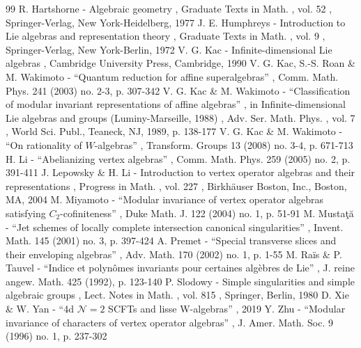 \documentclass[11pt]{article}
\numberwithin{equation}{section}
\begin{document}
\begin{thebibliography}{99}
 R. Hartshorne - Algebraic geometry , Graduate Texts in Math. , vol. 52 , Springer-Verlag, New York-Heidelberg, 1977
 J. E. Humphreys - Introduction to Lie algebras and representation theory , Graduate Texts in Math. , vol. 9 , Springer-Verlag, New York-Berlin, 1972
 V. G. Kac - Infinite-dimensional Lie algebras , Cambridge University Press, Cambridge, 1990
 V. G. Kac, S.-S. Roan \& M. Wakimoto - “Quantum reduction for affine superalgebras” , Comm. Math. Phys. 241 (2003) no. 2-3, p. 307-342
 V. G. Kac \& M. Wakimoto - “Classification of modular invariant representations of affine algebras” , in Infinite-dimensional Lie algebras and groups (Luminy-Marseille, 1988) , Adv. Ser. Math. Phys. , vol. 7 , World Sci. Publ., Teaneck, NJ, 1989, p. 138-177
 V. G. Kac \& M. Wakimoto - “On rationality of $W$-algebras” , Transform. Groups 13 (2008) no. 3-4, p. 671-713
 H. Li - “Abelianizing vertex algebras” , Comm. Math. Phys. 259 (2005) no. 2, p. 391-411
 J. Lepowsky \& H. Li - Introduction to vertex operator algebras and their representations , Progress in Math. , vol. 227 , Birkhäuser Boston, Inc., Boston, MA, 2004
 M. Miyamoto - “Modular invariance of vertex operator algebras satisfying $C_2$-cofiniteness” , Duke Math. J. 122 (2004) no. 1, p. 51-91
 M. Mustaţă - “Jet schemes of locally complete intersection canonical singularities” , Invent. Math. 145 (2001) no. 3, p. 397-424
 A. Premet - “Special transverse slices and their enveloping algebras” , Adv. Math. 170 (2002) no. 1, p. 1-55
 M. Raïs \& P. Tauvel - “Indice et polynômes invariants pour certaines algèbres de Lie” , J. reine angew. Math. 425 (1992), p. 123-140
 P. Slodowy - Simple singularities and simple algebraic groups , Lect. Notes in Math. , vol. 815 , Springer, Berlin, 1980
 D. Xie \& W. Yan - “4d $\mathcal{N}=2$ SCFTs and lisse W-algebras” , 2019
 Y. Zhu - “Modular invariance of characters of vertex operator algebras” , J. Amer. Math. Soc. 9 (1996) no. 1, p. 237-302
\end{thebibliography}
\end{document}
